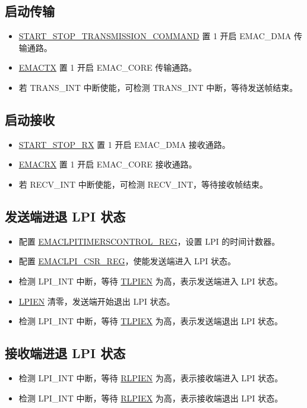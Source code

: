 \documentclass[main\_\_CN.tex]{subfiles}
\begin{document}
\subsection{启动传输}
\begin{itemize}
\item \hyperref[regdesc:DMAOPERATIONMODEREG]{START\_STOP\_TRANSMISSION\_COMMAND} 置 1 开启 EMAC\_DMA 传输通路。
\item \hyperref[regdesc:EMACCONFIGREG]{EMACTX} 置 1 开启 EMAC\_CORE 传输通路。
\item 若 TRANS\_INT 中断使能，可检测 TRANS\_INT 中断，等待发送帧结束。
\end{itemize}

\subsection{启动接收}
\begin{itemize}
\item \hyperref[regdesc:DMAOPERATIONMODEREG]{START\_STOP\_RX} 置 1 开启 EMAC\_DMA 接收通路。
\item \hyperref[regdesc:EMACCONFIGREG]{EMACRX} 置 1 开启 EMAC\_CORE 接收通路。
\item 若 RECV\_INT 中断使能，可检测 RECV\_INT，等待接收帧结束。
\end{itemize}

\subsection{发送端进退 LPI 状态}
\begin{itemize}
\item 配置 \hyperref[regdesc:EMACLPITIMERSCONTROLREG]{EMACLPITIMERSCONTROL\_REG}，设置 LPI 的时间计数器。
\item 配置 \hyperref[regdesc:EMACLPICSRREG]{EMACLPI\_CSR\_REG}，使能发送端进入 LPI 状态。
\item 检测 LPI\_INT 中断，等待 \hyperref[regdesc:EMACLPICSRREG]{TLPIEN} 为高，表示发送端进入 LPI 状态。
\item \hyperref[regdesc:EMACLPICSRREG]{LPIEN} 清零，发送端开始退出 LPI 状态。
\item 检测 LPI\_INT 中断，等待 \hyperref[regdesc:EMACLPICSRREG]{TLPIEX} 为高，表示发送端退出 LPI 状态。
\end{itemize}

\subsection{接收端进退 LPI 状态}
\begin{itemize}
\item 检测 LPI\_INT 中断，等待 \hyperref[regdesc:EMACLPICSRREG]{RLPIEN} 为高，表示接收端进入 LPI 状态。
\item 检测 LPI\_INT 中断，等待 \hyperref[regdesc:EMACLPICSRREG]{RLPIEX} 为高，表示接收端退出 LPI 状态。
\end{itemize}
\end{document}
